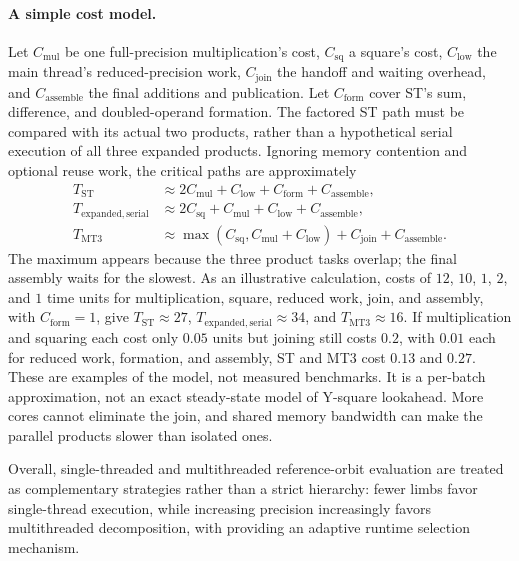\paragraph{A simple cost model.}
Let $C_{\mathrm{mul}}$ be one full-precision multiplication's cost,
$C_{\mathrm{sq}}$ a square's cost, $C_{\mathrm{low}}$ the main thread's
reduced-precision work, $C_{\mathrm{join}}$ the handoff and waiting overhead,
and $C_{\mathrm{assemble}}$ the final additions and publication. Let
$C_{\mathrm{form}}$ cover ST's sum, difference, and doubled-operand formation.
The factored ST path must be compared with its actual two products, rather
than a hypothetical serial execution of all three expanded products. Ignoring
memory contention and optional reuse work, the critical paths are approximately
\begin{align}
T_{\mathrm{ST}} &\approx 2C_{\mathrm{mul}}+C_{\mathrm{low}}
                  +C_{\mathrm{form}}+C_{\mathrm{assemble}}, \\
T_{\mathrm{expanded,serial}} &\approx 2C_{\mathrm{sq}}+C_{\mathrm{mul}}
                  +C_{\mathrm{low}}+C_{\mathrm{assemble}}, \\
T_{\mathrm{MT3}} &\approx
  \max(C_{\mathrm{sq}},C_{\mathrm{mul}}+C_{\mathrm{low}})
  +C_{\mathrm{join}}+C_{\mathrm{assemble}}.
\end{align}
The maximum appears because the three product tasks overlap; the final
assembly waits for the slowest.  As an illustrative calculation, costs of
$12$, $10$, $1$, $2$, and $1$ time units for multiplication, square, reduced
work, join, and assembly, with $C_{\mathrm{form}}=1$, give
$T_{\mathrm{ST}}\approx27$, $T_{\mathrm{expanded,serial}}\approx34$, and
$T_{\mathrm{MT3}}\approx16$.
If multiplication and squaring each cost only $0.05$ units but joining still
costs $0.2$, with $0.01$ each for reduced work, formation, and assembly, ST and
MT3 cost $0.13$ and $0.27$. These are examples of the model, not measured
benchmarks. It is a per-batch approximation, not an exact steady-state model
of Y-square lookahead. More cores cannot eliminate the join, and shared memory bandwidth
can make the parallel products slower than isolated ones.

Overall, single-threaded and multithreaded reference-orbit evaluation are
treated as complementary strategies rather than a strict hierarchy: fewer limbs
favor single-thread execution, while increasing precision increasingly favors
multithreaded decomposition, with  providing an adaptive runtime
selection mechanism.

